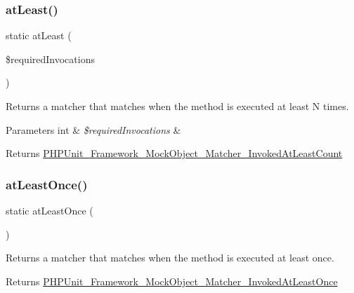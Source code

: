 \subsubsection{\texorpdfstring{at\+Least()}{atLeast()}}
{\footnotesize\ttfamily static at\+Least (\begin{DoxyParamCaption}\item[{}]{\$required\+Invocations }\end{DoxyParamCaption})\hspace{0.3cm}{\ttfamily [static]}}

Returns a matcher that matches when the method is executed at least N times.


\begin{DoxyParams}[1]{Parameters}
int & {\em \$required\+Invocations} & \\
\hline
\end{DoxyParams}
\begin{DoxyReturn}{Returns}
\mbox{\hyperlink{class_p_h_p_unit___framework___mock_object___matcher___invoked_at_least_count}{P\+H\+P\+Unit\+\_\+\+Framework\+\_\+\+Mock\+Object\+\_\+\+Matcher\+\_\+\+Invoked\+At\+Least\+Count}} 
\end{DoxyReturn}
\mbox{\label{class_p_h_p_unit___framework___test_case_a990434dbc71ecbf7c834b05bcf836ab8}} 
\subsubsection{\texorpdfstring{at\+Least\+Once()}{atLeastOnce()}}
{\footnotesize\ttfamily static at\+Least\+Once (\begin{DoxyParamCaption}{ }\end{DoxyParamCaption})\hspace{0.3cm}{\ttfamily [static]}}

Returns a matcher that matches when the method is executed at least once.

\begin{DoxyReturn}{Returns}
\mbox{\hyperlink{class_p_h_p_unit___framework___mock_object___matcher___invoked_at_least_once}{P\+H\+P\+Unit\+\_\+\+Framework\+\_\+\+Mock\+Object\+\_\+\+Matcher\+\_\+\+Invoked\+At\+Least\+Once}} 
\end{DoxyReturn}
\mbox{\label{class_p_h_p_unit___framework___test_case_aba87fba0064359677a16ca2c1fd59c7c}} 
